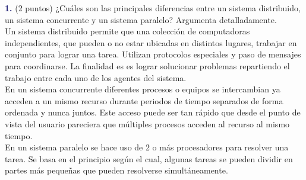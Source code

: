\newpage
\textbf{\textcolor{MidnightBlue}{1.}} (2 puntos) ¿Cuáles son las principales
diferencias entre un sistema distribuido, un sistema concurrente y un sistema
paralelo? Argumenta detalladamente.\\

Un sistema distribuido permite que una colección de computadoras independientes,
que pueden o no estar ubicadas en distintos lugares, trabajar en conjunto para
lograr una tarea. Utilizan protocolos especiales y paso de mensajes para
coordinarse. La finalidad es es lograr solucionar problemas repartiendo el
trabajo entre cada uno de los agentes del sistema.\\

En un sistema concurrente diferentes procesos o equipos se intercambian ya
acceden a un mismo recurso durante periodos de tiempo separados de forma
ordenada y nunca juntos. Este acceso puede ser tan rápido que desde el punto
de vista del usuario pareciera que múltiples procesos acceden al recurso al
mismo tiempo.\\

En un sistema paralelo se hace uso de 2 o más procesadores para resolver una
tarea. Se basa en el principio según el cual, algunas tareas se pueden dividir
en partes más pequeñas que pueden resolverse simultáneamente.
